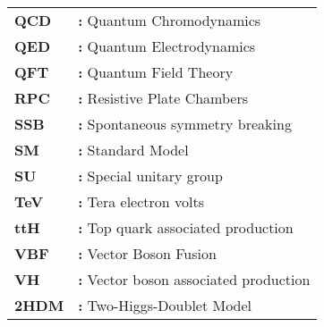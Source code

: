 \begin{tabular}{@{}p{2cm}l}
{\bf QCD} & {\bf:} Quantum Chromodynamics\\
{\bf QED} & {\bf:} Quantum Electrodynamics\\
{\bf QFT} & {\bf:} Quantum Field Theory\\
{\bf RPC} & {\bf:} Resistive Plate Chambers\\
{\bf SSB} & {\bf:} Spontaneous symmetry breaking\\
{\bf SM} & {\bf:} Standard Model\\
{\bf SU} & {\bf:} Special unitary group\\
{\bf TeV} & {\bf:} Tera electron volts\\
{\bf ttH} & {\bf:} Top quark associated production\\
{\bf VBF} & {\bf:} Vector Boson Fusion\\
{\bf VH} & {\bf:} Vector boson associated production\\
{\bf 2HDM} & {\bf:} Two-Higgs-Doublet Model\\
\end{tabular}
